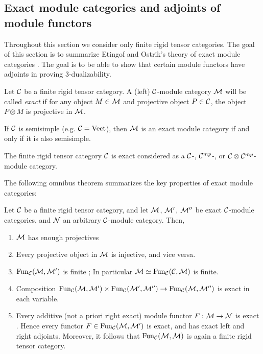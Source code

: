 \documentclass{amsart}
\begin{document}
\subsection{Exact module categories and adjoints of module functors}
Throughout this section we consider only finite rigid tensor categories.  The goal of this section is to summarize Etingof and Ostrik's theory of exact module categories \cite{MR2119143}.  The goal is to be able to show that certain module functors have adjoints in proving $3$-dualizability.

\begin{definition}
	Let $\mathcal C$ be a finite rigid tensor category. A (left) $\mathcal C$-module category $\mathcal M$ will be called {\em exact} if for any object $M \in \mathcal M$ and  projective object $P \in \mathcal C$, the object $P \otimes M$ is projective in $\mathcal M$. 
\end{definition}

\begin{example}
	If $\mathcal C$ is semisimple (e.g. $\mathcal C = \mathrm{Vect}$), then $\mathcal M$ is an exact module category if and only if it is also semisimple.
\end{example}

\begin{example}
	The finite rigid tensor category $\mathcal C$ is exact considered as a $\mathcal C$-, $\mathcal C^{mp}$-, or $\mathcal C \otimes \mathcal C^{mp}$-module category. 
\end{example}

The following omnibus theorem summarizes the key properties of exact module categories: 
\begin{theorem} \label{Thm:ExactModCatOmnibus}
	Let $\mathcal C$ be a finite rigid tensor category, and let $\mathcal M$, $\mathcal M'$, $\mathcal M''$ be exact $\mathcal C$-module categories, and $\mathcal N$ an arbitrary $\mathcal C$-module category. Then,
	\begin{enumerate}
		\item $\mathcal M$ has enough projectives \cite[Lemma 2.7.1]{EGNO}
		\item Every projective object in $\mathcal M$  is injective, and vice versa. \cite[Cor 2.7.4]{EGNO}
		\item $\operatorname{Fun}_{\mathcal C}(\mathcal M, \mathcal M')$ is finite \cite[Prop 2.13.5]{EGNO}; In particular $\mathcal M \simeq \operatorname{Fun}_{\mathcal C}(\mathcal C, \mathcal M)$ is finite.
		\item Composition $\operatorname{Fun}_{\mathcal C}(\mathcal M, \mathcal M') \times \operatorname{Fun}_{\mathcal C}(\mathcal M', \mathcal M'') \to \operatorname{Fun}_{\mathcal C}(\mathcal M, \mathcal M'')$ is exact in each variable. \cite[Lemma 2.13.2]{EGNO}		
		\item Every additive (not a priori right exact) module functor $F:\mathcal M \to \mathcal N$ is exact \cite[Prop 2.7.8]{EGNO}. Hence every functor $F \in \operatorname{Fun}_{\mathcal C}(\mathcal M, \mathcal M')$ is exact, and has exact left and right adjoints. Moreover, it follows that   $\operatorname{Fun}_{\mathcal C}(\mathcal M,\mathcal M)$ is again a finite rigid tensor category. 
	\end{enumerate}
\end{theorem}
\end{document}
